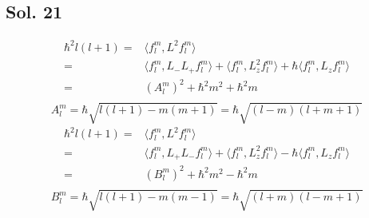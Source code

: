    \subsection*{Sol. 21}
   \begin{align*}
        \hbar^2 l(l+1)
       =&\langle f^{m}_l, L^2f^m_l\rangle\\
       =&
       \langle f^{m}_l, L_-L_+f^m_l\rangle
       +\langle f^{m}_l, L_z^2f^m_l\rangle
       +\hbar \langle f^{m}_l, L_zf^m_l\rangle\\
       =&(A^m_l)^2 + \hbar^2m^2 + \hbar^2 m\\
   \end{align*}
   $$
   A^m_l = \hbar\sqrt{l(l+1)-m(m+1)}
   =\hbar\sqrt{(l-m)(l+m+1)}
   $$
   \begin{align*}
        \hbar^2 l(l+1)
       =&\langle f^{m}_l, L^2f^m_l\rangle\\
       =&
       \langle f^{m}_l, L_+L_-f^m_l\rangle
       +\langle f^{m}_l, L_z^2f^m_l\rangle
       -\hbar \langle f^{m}_l, L_zf^m_l\rangle\\
       =&(B^m_l)^2 + \hbar^2m^2 - \hbar^2 m\\
   \end{align*}
   $$
   B^m_l = \hbar\sqrt{l(l+1)-m(m-1)}
   =\hbar\sqrt{(l+m)(l-m+1)}
   $$

